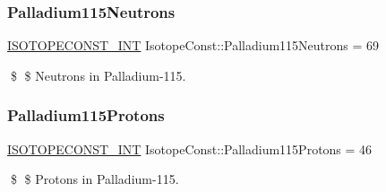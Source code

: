 \subsubsection{\texorpdfstring{Palladium115\+Neutrons}{Palladium115Neutrons}}
{\footnotesize\ttfamily \mbox{\hyperlink{group___isotope_const-_macros_ga5f18360b3e99483a35c32d789e62621c}{I\+S\+O\+T\+O\+P\+E\+C\+O\+N\+S\+T\+\_\+\+I\+NT}} Isotope\+Const\+::\+Palladium115\+Neutrons = 69}

\$ \$ Neutrons in Palladium-\/115. \mbox{\label{group___isotope_const-_palladium-_pd115_gaad151e44b35d363348e445b7c3e1e2ce}} 
\subsubsection{\texorpdfstring{Palladium115\+Protons}{Palladium115Protons}}
{\footnotesize\ttfamily \mbox{\hyperlink{group___isotope_const-_macros_ga5f18360b3e99483a35c32d789e62621c}{I\+S\+O\+T\+O\+P\+E\+C\+O\+N\+S\+T\+\_\+\+I\+NT}} Isotope\+Const\+::\+Palladium115\+Protons = 46}

\$ \$ Protons in Palladium-\/115. 